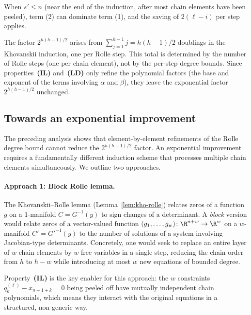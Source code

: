 When $s' \leq n$ (near the end of the induction, after most chain elements have been peeled), term (2) can dominate term (1), and the saving of $2(\ell - i)$ per step applies.

\begin{remark}\label{rem:robust-doubling}
  The factor $2^{h(h-1)/2}$ arises from $\sum_{j=1}^{h-1} j = h(h-1)/2$ doublings in the Khovanskii induction, one per Rolle step. This total is determined by the number of Rolle steps (one per chain element), not by the per-step degree bounds. Since properties~\textbf{(IL)} and~\textbf{(LD)} only refine the polynomial factors (the base and exponent of the terms involving $\alpha$ and $\beta$), they leave the exponential factor $2^{h(h-1)/2}$ unchanged.
\end{remark}

\subsection{Towards an exponential improvement}\label{subsec:block-rolle}

The preceding analysis shows that element-by-element refinements of the Rolle degree bound cannot reduce the $2^{h(h-1)/2}$ factor. An exponential improvement requires a fundamentally different induction scheme that processes multiple chain elements simultaneously. We outline two approaches.

\paragraph{Approach 1: Block Rolle lemma.}
The Khovanskii--Rolle lemma (Lemma~\ref{lem:kho-rolle}) relates zeros of a function $g$ on a $1$-manifold $C = G^{-1}(y)$ to sign changes of a determinant. A \emph{block} version would relate zeros of a vector-valued function $(g_1, \ldots, g_w)\colon \R^{n+w} \to \R^w$ on a $w$-manifold $C' = G'^{-1}(y)$ to the number of solutions of a system involving Jacobian-type determinants. Concretely, one would seek to replace an entire layer of $w$ chain elements by $w$ free variables in a single step, reducing the chain order from $h$ to $h - w$ while introducing at most $w$ new equations of bounded degree.

Property~\textbf{(IL)} is the key enabler for this approach: the $w$ constraints $q_k^{(\ell)} - x_{n+1+k} = 0$ being peeled off have mutually independent chain polynomials, which means they interact with the original equations in a structured, non-generic way.

